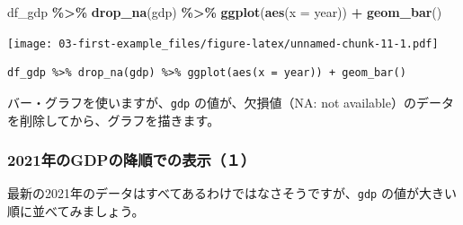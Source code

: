 \documentclass[
  xelatex, ja=standard]{bxjsbook}
\newenvironment{Shaded}{\begin{snugshade}}{\end{snugshade}}
\newcommand{\AttributeTok}[1]{\textcolor[rgb]{0.13,0.29,0.53}{#1}}
\newcommand{\FunctionTok}[1]{\textcolor[rgb]{0.13,0.29,0.53}{\textbf{#1}}}
\newcommand{\NormalTok}[1]{#1}
\newcommand{\SpecialCharTok}[1]{\textcolor[rgb]{0.81,0.36,0.00}{\textbf{#1}}}
\theoremstyle{definition}
\theoremstyle{definition}
\theoremstyle{definition}
\theoremstyle{definition}
\theoremstyle{remark}
\begin{document}
\begin{Shaded}
\begin{Highlighting}[]
\NormalTok{df\_gdp }\SpecialCharTok{\%\textgreater{}\%} \FunctionTok{drop\_na}\NormalTok{(gdp) }\SpecialCharTok{\%\textgreater{}\%} \FunctionTok{ggplot}\NormalTok{(}\FunctionTok{aes}\NormalTok{(}\AttributeTok{x =}\NormalTok{ year)) }\SpecialCharTok{+} \FunctionTok{geom\_bar}\NormalTok{()}
\end{Highlighting}
\end{Shaded}

\texttt{[image: 03-first-example\_files/figure-latex/unnamed-chunk-11-1.pdf]}

\begin{verbatim}
df_gdp %>% drop_na(gdp) %>% ggplot(aes(x = year)) + geom_bar()
\end{verbatim}

バー・グラフを使いますが、\texttt{gdp} の値が、欠損値（NA: not available）のデータを削除してから、グラフを描きます。

\hypertarget{ux5e74ux306egdpux306eux964dux9806ux3067ux306eux8868ux793auxff11}{%
\subsubsection{2021年のGDPの降順での表示（１）}\label{ux5e74ux306egdpux306eux964dux9806ux3067ux306eux8868ux793auxff11}}

最新の2021年のデータはすべてあるわけではなさそうですが、\texttt{gdp} の値が大きい順に並べてみましょう。
\end{document}

